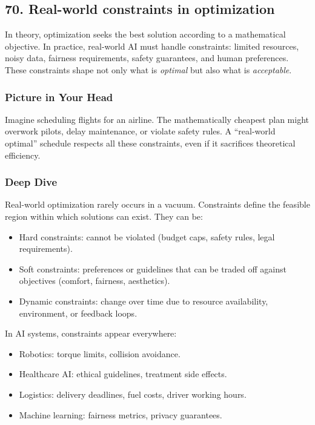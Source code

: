 \documentclass[
  letterpaper,
  DIV=11,
  numbers=noendperiod]{scrreprt}
\providecommand{\tightlist}{%
  \setlength{\itemsep}{0pt}\setlength{\parskip}{0pt}}
\begin{document}
\subsection{70. Real-world constraints in
optimization}\label{real-world-constraints-in-optimization}

In theory, optimization seeks the best solution according to a
mathematical objective. In practice, real-world AI must handle
constraints: limited resources, noisy data, fairness requirements,
safety guarantees, and human preferences. These constraints shape not
only what is \emph{optimal} but also what is \emph{acceptable}.

\subsubsection{Picture in Your Head}\label{picture-in-your-head-69}

Imagine scheduling flights for an airline. The mathematically cheapest
plan might overwork pilots, delay maintenance, or violate safety rules.
A ``real-world optimal'' schedule respects all these constraints, even
if it sacrifices theoretical efficiency.

\subsubsection{Deep Dive}\label{deep-dive-69}

Real-world optimization rarely occurs in a vacuum. Constraints define
the feasible region within which solutions can exist. They can be:

\begin{itemize}
\tightlist
\item
  Hard constraints: cannot be violated (budget caps, safety rules, legal
  requirements).
\item
  Soft constraints: preferences or guidelines that can be traded off
  against objectives (comfort, fairness, aesthetics).
\item
  Dynamic constraints: change over time due to resource availability,
  environment, or feedback loops.
\end{itemize}

In AI systems, constraints appear everywhere:

\begin{itemize}
\tightlist
\item
  Robotics: torque limits, collision avoidance.
\item
  Healthcare AI: ethical guidelines, treatment side effects.
\item
  Logistics: delivery deadlines, fuel costs, driver working hours.
\item
  Machine learning: fairness metrics, privacy guarantees.
\end{itemize}
\end{document}
